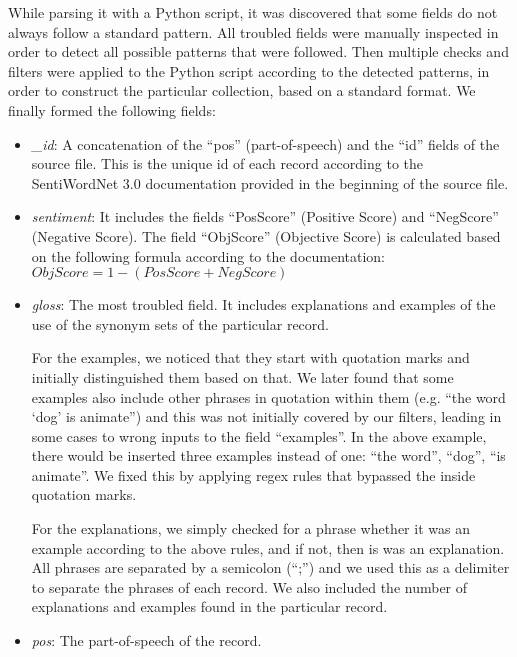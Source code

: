 While parsing it with a Python script, it was discovered that
some fields do not always follow a standard pattern.
All troubled fields were manually inspected
in order to detect all possible patterns that were followed.
Then multiple checks and filters were applied to the Python script 
according to the detected patterns,
in order to construct the particular collection,
based on a standard format.
We finally formed the following fields:

\begin{itemize}
  \item \emph{\_id}: A concatenation of the ``pos'' (part-of-speech)
  and the ``id'' fields of the source file.
  This is the unique id of each record according to the SentiWordNet 3.0
  documentation provided in the beginning of the source file. 
  
  \item \emph{sentiment}: It includes the fields ``PosScore'' (Positive Score)
  and ``NegScore'' (Negative Score).
  The field ``ObjScore'' (Objective Score) is calculated
  based on the following formula according to the documentation: \\
  $ObjScore = 1 - (PosScore + NegScore)$
  
  \item \emph{gloss}: The most troubled field.
  It includes explanations and examples of the use of the synonym sets
  of the particular record.

  For the examples, we noticed that they start with quotation marks
  and initially distinguished them based on that.
  We later found that some examples also include other phrases 
  in quotation within them (e.g. ``the word `dog' is animate'')
  and this was not initially covered by our filters,
  leading in some cases to wrong inputs to the field ``examples''.
  In the above example, there would be inserted three examples
  instead of one: ``the word'', ``dog'', ``is animate''.
  We fixed this by applying regex rules
  that bypassed the inside quotation marks.

  For the explanations, we simply checked for a phrase
  whether it was an example according to the above rules,
  and if not, then is was an explanation.
  All phrases are separated by a semicolon (``;'')
  and we used this as a delimiter to separate the phrases
  of each record.
  We also included the number of explanations and examples
  found in the particular record.
  
  \item \emph{pos}: The part-of-speech of the record.
  

\end{itemize}
